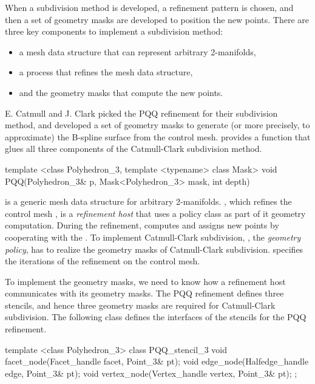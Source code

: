 When a subdivision method is developed, a refinement pattern is 
chosen, and then a set of geometry masks are developed to 
position the new points. There are three key components 
to implement a subdivision method: 
\begin{itemize}
\item
a mesh data structure that can represent arbitrary 2-manifolds, 
\item
a process that refines the mesh data structure, 
\item
and the geometry masks that compute the new points.
\end{itemize}

E. Catmull and J. Clark picked the
PQQ refinement for their subdivision method,
and developed a set of geometry masks to generate (or more 
precisely, to approximate) the B-spline surface from 
the control mesh.
 provides a function that glues all 
three components of the Catmull-Clark subdivision method.

\begin{ccExampleCode}
template <class Polyhedron_3, template <typename> class Mask>
void PQQ(Polyhedron_3& p, Mask<Polyhedron_3> mask, int depth)
\end{ccExampleCode}

 is a generic mesh data structure for 
arbitrary 2-manifolds. , which refines the control mesh 
, is a \emph{refinement host} that uses a policy class
 as part of it geometry computation. 
During the refinement,  computes and assigns
new points by cooperating with the . 
To implement Catmull-Clark subdivision,
, the \emph{geometry policy}, has to realize the 
geometry masks of Catmull-Clark subdivision. 
 specifies the iterations of the refinement 
on the control mesh. 

To implement the geometry masks, we need to know how  
a refinement host communicates with its geometry masks. 
The PQQ refinement defines three stencils, and hence 
three geometry masks are required for Catmull-Clark subdivision.
The following class defines the interfaces of the stencils 
for the PQQ refinement.

\begin{ccExampleCode}
template <class Polyhedron_3>
class PQQ_stencil_3 {
  void facet_node(Facet_handle facet, Point_3& pt);
  void edge_node(Halfedge_handle edge, Point_3& pt);
  void vertex_node(Vertex_handle vertex, Point_3& pt);
};
\end{ccExampleCode}

